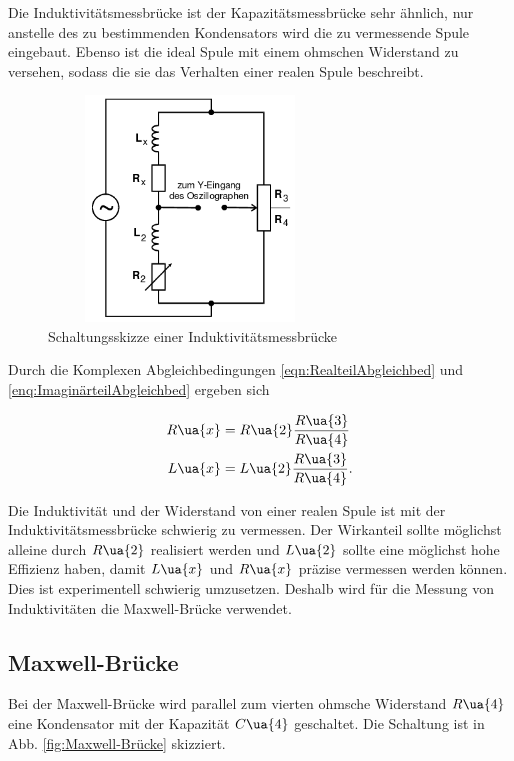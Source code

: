 Die Induktivitätsmessbrücke ist der Kapazitätsmessbrücke sehr ähnlich, nur anstelle
des zu bestimmenden Kondensators wird die zu vermessende Spule eingebaut.
Ebenso ist die ideal Spule mit einem ohmschen Widerstand zu versehen, sodass
die sie das Verhalten einer realen Spule beschreibt.
\begin{figure}
  \includegraphics[width=7.50cm, height=6cm]{V302_Induktivitätsmessbrücke}
  \caption{Schaltungsskizze einer Induktivitätsmessbrücke\cite{anleitung01}}
  \label{fig:Induktivitätsmessbrücke}
\end{figure}

Durch die Komplexen Abgleichbedingungen \eqref{eqn:RealteilAbgleichbed} und
\eqref{enq:ImaginärteilAbgleichbed} ergeben sich

\begin{align}
  R\ua{x} &= R\ua{2}\frac{R\ua{3}}{R\ua{4}}\label{InduktivitätmessbrückeRx}\\
  L\ua{x} &= L\ua{2}\frac{R\ua{3}}{R\ua{4}}.\label{InduktivitätmessbrückeLx}
\end{align}

Die Induktivität und der Widerstand von einer realen Spule ist mit der
Induktivitätsmessbrücke schwierig zu vermessen. Der Wirkanteil sollte
möglichst alleine durch $R\ua{2}$ realisiert werden und $L\ua{2}$ sollte
eine möglichst hohe Effizienz haben, damit $L\ua{x}$ und $R\ua{x}$ präzise vermessen
werden können. Dies ist experimentell schwierig umzusetzen.
Deshalb wird für die Messung von Induktivitäten die Maxwell-Brücke verwendet.

\subsection{Maxwell-Brücke}

Bei der Maxwell-Brücke wird parallel zum vierten ohmsche Widerstand $R\ua{4}$
eine Kondensator mit der Kapazität $C\ua{4}$ geschaltet. Die Schaltung ist in
Abb. \ref{fig:Maxwell-Brücke} skizziert.

